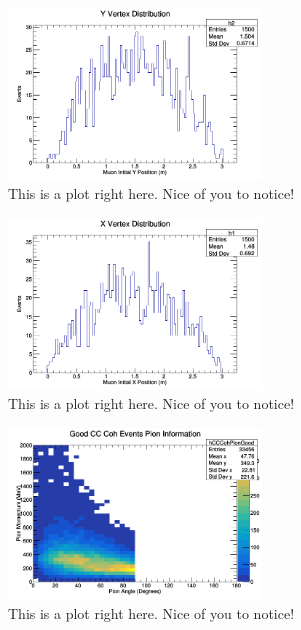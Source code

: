 \documentclass[11pt]{article}
\begin{document}
\begin{figure}[H]
\centering
\includegraphics[width=0.6\textwidth]{NewNMBergerSehgalImages/3-YVertexDistributionNMBS.png}
\caption{This is a plot right here. Nice of you to notice!}
\end{figure}

\begin{figure}[H]
\centering
\includegraphics[width=0.6\textwidth]{NewNMBergerSehgalImages/4-XVertexDistributionNMBS.png}
\caption{This is a plot right here. Nice of you to notice!}
\end{figure}

\begin{figure}[H]
\centering
\includegraphics[width=0.6\textwidth]{NewNMBergerSehgalImages/5-GoodCCCohPionInfoNMBS.png}
\caption{This is a plot right here. Nice of you to notice!}
\end{figure}
\end{document}
